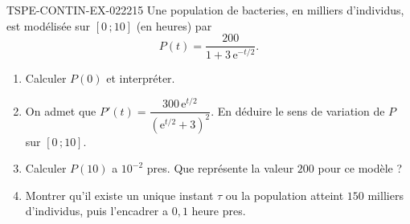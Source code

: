 \begin{exercice}{TSPE-CONTIN-EX-022}{2}{15}
Une population de bacteries, en milliers d'individus, est modélisée sur $[0\,;10]$ (en heures) par
\[ P(t) = \frac{200}{1 + 3\,\mathrm{e}^{-t/2}}. \]
\begin{enumerate}
  \item Calculer $P(0)$ et interpréter.
  \item On admet que $P'(t) = \dfrac{300\,\mathrm{e}^{t/2}}{\left(\mathrm{e}^{t/2}+3\right)^2}$. En déduire le sens de variation de $P$ sur $[0\,;10]$.
  \item Calculer $P(10)$ a $10^{-2}$ pres. Que représente la valeur $200$ pour ce modèle ?
  \item Montrer qu'il existe un unique instant $\tau$ ou la population atteint $150$ milliers d'individus, puis l'encadrer a $0{,}1$ heure pres.
\end{enumerate}
\end{exercice}
